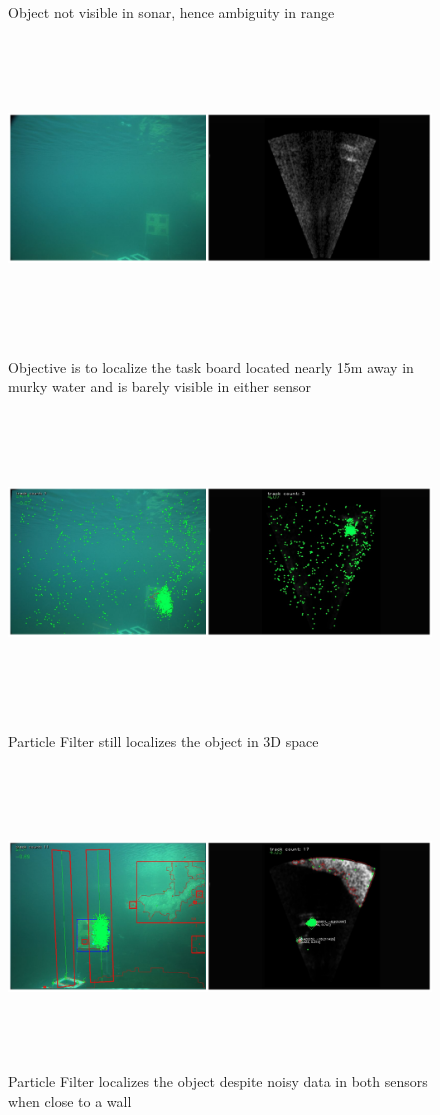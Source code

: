 \documentclass[a4paper]{IEEEtran}
\begin{document}
\begin{figure}
  \captionsetup{font=small,skip=-10pt,justification=centering}
  \caption{Object not visible in sonar, hence ambiguity in range}
\end{figure}

\begin{figure}
  \includegraphics[width=\textwidth,height=8cm]{pfsem1}
  \caption{Objective is to localize the task board located nearly 15m away in murky water and is barely visible in either sensor}
  \includegraphics[width=\textwidth,height=8cm]{pfsem2}
  \caption{Particle Filter still localizes the object in 3D space}
  \includegraphics[width=\textwidth,height=8cm]{pfsem3}
  \captionsetup{font=small,skip=-10pt,justification=centering}
  \caption{Particle Filter localizes the object despite noisy data in both sensors when close to a wall}
\end{figure}
\end{document}
